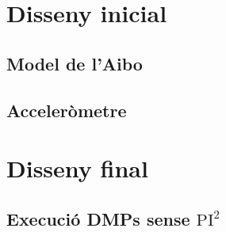 \documentclass[12pt,a4paper,final,twoside]{article}
\begin{document}
\newpage
\section{Disseny inicial}

\subsection{Model de l'Aibo}

\subsection{Acceleròmetre}

\newpage
\section{Disseny final}


\subsection{Execució DMPs sense $\mathrm{PI^2}$}
\end{document}
